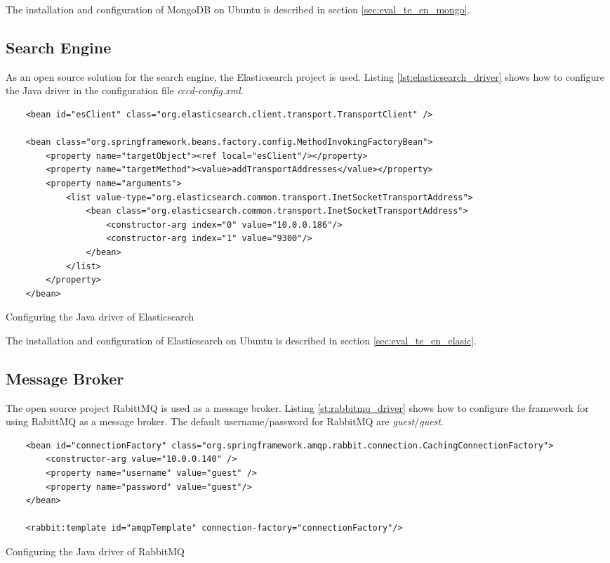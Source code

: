 The installation and configuration of MongoDB on Ubuntu is described in section \ref{sec:eval_te_en_mongo}.

\subsection{Search Engine\label{sec:des_se_en}}
As an open source solution for the search engine, the Elasticsearch project is used. Listing \ref{lst:elasticsearch_driver} shows how to configure the Java driver in the configuration file \textit{cccd-config.xml}.

\begin{code}
\begin{verbatim}
	<bean id="esClient" class="org.elasticsearch.client.transport.TransportClient" />
	
	<bean class="org.springframework.beans.factory.config.MethodInvokingFactoryBean">
		<property name="targetObject"><ref local="esClient"/></property>
		<property name="targetMethod"><value>addTransportAddresses</value></property>
		<property name="arguments"> 
			<list value-type="org.elasticsearch.common.transport.InetSocketTransportAddress">
				<bean class="org.elasticsearch.common.transport.InetSocketTransportAddress">
					<constructor-arg index="0" value="10.0.0.186"/>
					<constructor-arg index="1" value="9300"/>
				</bean>
		 	</list>
		</property>
	</bean>
\end{verbatim}
\caption{Configuring the Java driver of Elasticsearch}
\label{lst:elasticsearch_driver}
\end{code}

The installation and configuration of Elasticsearch on Ubuntu is described in section \ref{sec:eval_te_en_elasic}.

\subsection{Message Broker\label{sec:des_wq}}
The open source project RabittMQ is used as a message broker. Listing \ref{st:rabbitmq_driver}  shows how to configure the framework for using RabittMQ as a message broker. The default username/password for RabbitMQ are \textit{guest}/\textit{guest}.

\begin{code}
\begin{verbatim}
	<bean id="connectionFactory" class="org.springframework.amqp.rabbit.connection.CachingConnectionFactory">
	    <constructor-arg value="10.0.0.140" />
		<property name="username" value="guest" />
	    <property name="password" value="guest"/>
	</bean>
	
	<rabbit:template id="amqpTemplate" connection-factory="connectionFactory"/>
\end{verbatim}
\caption{Configuring the Java driver of RabbitMQ}
\label{lst:rabbitmq_driver}
\end{code}

